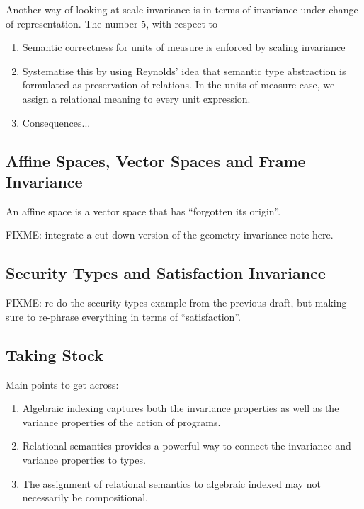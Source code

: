 Another way of looking at scale invariance is in terms of invariance
under change of representation. The number $5$, with respect to 

\begin{enumerate}
\item Semantic correctness for units of measure is enforced by scaling
  invariance
\item Systematise this by using Reynolds' idea that semantic type
  abstraction is formulated as preservation of relations. In the units
  of measure case, we assign a relational meaning to every unit
  expression.
\item Consequences...
\end{enumerate}

\subsection{Affine Spaces, Vector Spaces and Frame Invariance}
\label{sec:vector-spaces-intro}

An affine space is a vector space that has ``forgotten its origin''. 

FIXME: integrate a cut-down version of the geometry-invariance note
here.

\subsection{Security Types and Satisfaction Invariance}
\label{sec:security-types-intro}

FIXME: re-do the security types example from the previous draft, but
making sure to re-phrase everything in terms of ``satisfaction''.



\subsection{Taking Stock}
\label{sec:taking-stock}

Main points to get across:
\begin{enumerate}
\item Algebraic indexing captures both the invariance properties as
  well as the variance properties of the action of programs.
\item Relational semantics provides a powerful way to connect the
  invariance and variance properties to types.
\item The assignment of relational semantics to algebraic indexed may
  not necessarily be compositional.
\end{enumerate}


